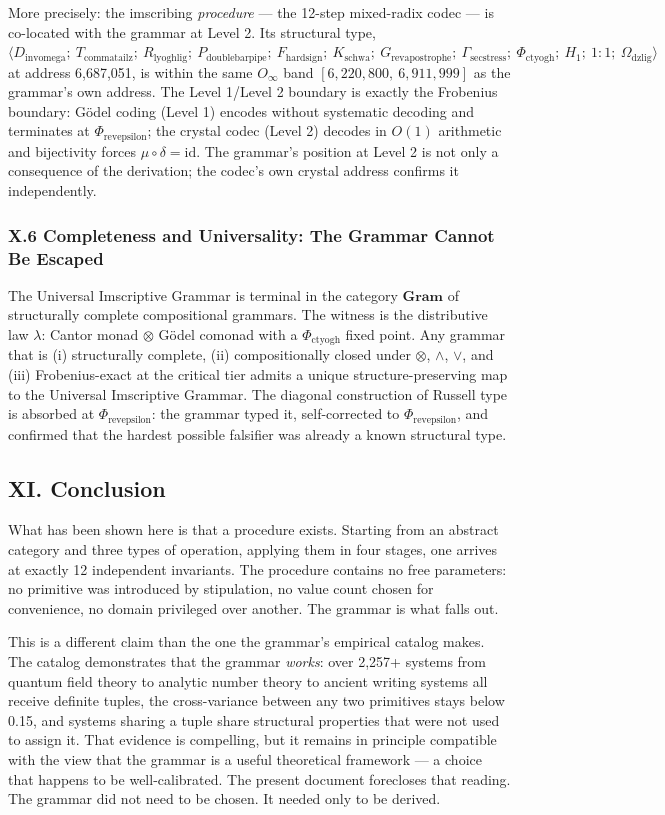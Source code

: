 \documentclass[12pt,a4paper]{article}
\newcommand{\UIG}{Universal Imscriptive Grammar}
\begin{document}
More precisely: the imscribing \emph{procedure} --- the 12-step mixed-radix codec --- is co-located with the grammar at Level 2. Its structural type, $\langle D_{\text{invomega}};\ T_{\text{commatailz}};\ R_{\text{lyoghlig}};\ P_{\text{doublebarpipe}};\ F_{\text{hardsign}};\ K_{\text{schwa}};\ G_{\text{revapostrophe}};\ \Gamma_{\text{secstress}};\ \Phi_{\text{ctyogh}};\ H_1;\ 1{:}1;\ \Omega_{\text{dzlig}} \rangle$ at address 6,687,051, is within the same $O_\infty$ band $[6{,}220{,}800,\ 6{,}911{,}999]$ as the grammar's own address. The Level 1/Level 2 boundary is exactly the Frobenius boundary: G\"odel coding (Level 1) encodes without systematic decoding and terminates at $\Phi_{\text{revepsilon}}$; the crystal codec (Level 2) decodes in $O(1)$ arithmetic and bijectivity forces $\mu \circ \delta = \text{id}$. The grammar's position at Level 2 is not only a consequence of the derivation; the codec's own crystal address confirms it independently.

\subsubsection{X.6 Completeness and Universality: The Grammar Cannot Be Escaped}
The \UIG{} is terminal in the category $\mathbf{Gram}$ of structurally complete compositional grammars. The witness is the distributive law $\lambda$: Cantor monad $\otimes$ G\"odel comonad with a $\Phi_{\text{ctyogh}}$ fixed point. Any grammar that is (i) structurally complete, (ii) compositionally closed under $\otimes$, $\wedge$, $\vee$, and (iii) Frobenius-exact at the critical tier admits a unique structure-preserving map to the \UIG{}. The diagonal construction of Russell type is absorbed at $\Phi_{\text{revepsilon}}$: the grammar typed it, self-corrected to $\Phi_{\text{revepsilon}}$, and confirmed that the hardest possible falsifier was already a known structural type.

\subsection{XI. Conclusion}
What has been shown here is that a procedure exists. Starting from an abstract category and three types of operation, applying them in four stages, one arrives at exactly 12 independent invariants. The procedure contains no free parameters: no primitive was introduced by stipulation, no value count chosen for convenience, no domain privileged over another. The grammar is what falls out.

This is a different claim than the one the grammar's empirical catalog makes. The catalog demonstrates that the grammar \emph{works}: over 2,257+ systems from quantum field theory to analytic number theory to ancient writing systems all receive definite tuples, the cross-variance between any two primitives stays below 0.15, and systems sharing a tuple share structural properties that were not used to assign it. That evidence is compelling, but it remains in principle compatible with the view that the grammar is a useful theoretical framework --- a choice that happens to be well-calibrated. The present document forecloses that reading. The grammar did not need to be chosen. It needed only to be derived.
\end{document}
